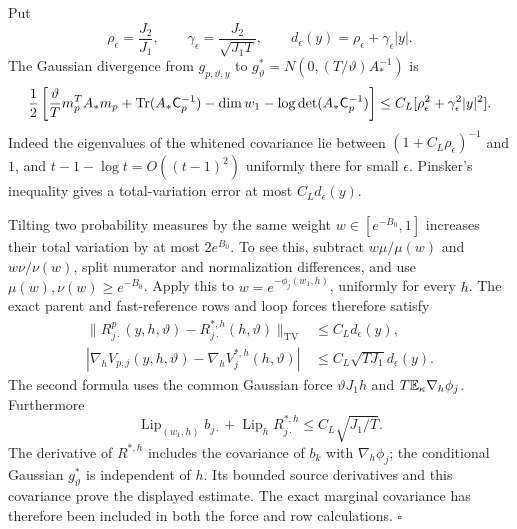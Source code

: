 Put
\begin{equation}
 \rho_\epsilon=\frac{J_2}{J_1},\qquad
 \gamma_\epsilon=\frac{J_2}{\sqrt{J_1T}},\qquad
 d_\epsilon(y)=\rho_\epsilon+\gamma_\epsilon|y|.
 \label{eq:rg-formation-environment-scales}
\end{equation}
The Gaussian divergence from
$g_{p,\vartheta,y}$ to
$g_\vartheta^*=N(0,(T/\vartheta)A_*^{-1})$ is
\begin{equation}
 \frac12\left[
  \frac{\vartheta}{T}m_p^TA_*m_p
  +\operatorname{Tr}(A_*\mathsf C_p^{-1})-\dim w_1
            -\log\det(A_*\mathsf C_p^{-1})\right]
 \le C_L[\rho_\epsilon^2+\gamma_\epsilon^2|y|^2].
 \label{eq:rg-formation-first-normal-gaussian-kl}
\end{equation}
Indeed the eigenvalues of the whitened covariance lie between
$(1+C_L\rho_\epsilon)^{-1}$ and $1$, and
$t-1-\log t=O((t-1)^2)$ uniformly there for small $\epsilon$.
Pinsker's inequality gives a total-variation error at most
$C_Ld_\epsilon(y)$.

Tilting two probability measures by the same weight
$w\in[e^{-B_0},1]$ increases their total variation by at most
$2e^{B_0}$. To see this, subtract $w\mu/\mu(w)$ and
$w\nu/\nu(w)$, split numerator and normalization differences, and
use $\mu(w),\nu(w)\ge e^{-B_0}$.
Apply this to $w=e^{-\phi_j(w_1,h)}$, uniformly for every $h$.
The exact parent and fast-reference rows and loop forces therefore
satisfy
\begin{align}
 \|R_{j\cdot}^p(y,h,\vartheta)
          -R_{j\cdot}^{*,h}(h,\vartheta)\|_{\mathrm{TV}}
 &\le C_Ld_\epsilon(y),
 \label{eq:rg-formation-parent-row-environment}\\
 |\nabla_hV_{p,j}(y,h,\vartheta)
           -\nabla_hV_j^{*,h}(h,\vartheta)|
 &\le C_L\sqrt{TJ_1} d_\epsilon(y).
 \label{eq:rg-formation-parent-force-environment}
\end{align}
The second formula uses the common Gaussian force
$\vartheta J_1h$ and
$T\mathbb E_\kappa\nabla_h\phi_j$.
Furthermore
\begin{equation}
 \operatorname{Lip}_{(w_1,h)}b_{j\cdot}
       +\operatorname{Lip}_h R_{j\cdot}^{*,h}
 \le C_L\sqrt{J_1/T}.
 \label{eq:rg-formation-row-fast-lipschitz}
\end{equation}
The derivative of $R^{*,h}$ includes the covariance of $b_k$ with
$\nabla_h\phi_j$; the conditional Gaussian $g_\vartheta^*$ is
independent of $h$. Its bounded source derivatives and this
covariance prove the displayed estimate. The exact marginal
covariance has therefore been included in both the force and row
calculations. \hfill$\square$

